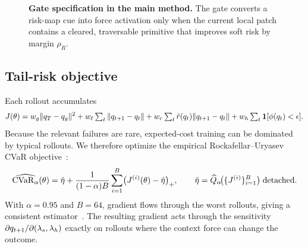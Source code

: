 \begin{figure}[t]
\centering
{}
\caption{\textbf{Gate specification in the main method.}
The gate converts a risk-map cue into force activation only when the current
local patch contains a cleared, traversable primitive that improves soft risk
by margin $\rho_R$.}
\label{fig:route_gate_main}
\end{figure}

\subsection{Tail-risk objective}
\label{sec:method:cvar}

Each rollout accumulates
\begin{equation}
J(\theta) =
w_g\|q_T-q_g\|^2
+ w_\ell\textstyle\sum_t\|q_{t+1}-q_t\|
+ w_r\textstyle\sum_t\tilde r(q_t)\|q_{t+1}-q_t\|
+ w_h\textstyle\sum_t\mathbf{1}[\phi(q_t)<\epsilon].
\label{eq:method:J}
\end{equation}
Because the relevant failures are rare, expected-cost training can be dominated
by typical rollouts.  We therefore optimize the empirical
Rockafellar--Uryasev CVaR objective~\citep{rockafellar2000optimization}:
\begin{equation}
\widehat{\mathrm{CVaR}_{\alpha}}(\theta)
=
\hat\eta
+\frac{1}{(1-\alpha)B}
\sum_{i=1}^{B}\bigl(J^{(i)}(\theta)-\hat\eta\bigr)_+,
\qquad
\hat\eta=\widehat Q_\alpha\!\bigl(\{J^{(i)}\}_{i=1}^B\bigr)\;\text{detached}.
\label{eq:method:cvar_emp}
\end{equation}
With $\alpha=0.95$ and $B=64$, gradient flows through the worst rollouts,
giving a consistent estimator~\citep{hong2014monte}.  The resulting gradient
acts through the sensitivity
$\partial q_{t+1}/\partial(\lambda_s,\lambda_h)$ exactly on rollouts where
the context force can change the outcome.

